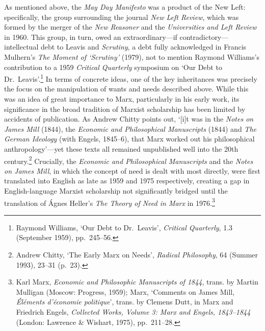 \documentclass[]{article}
\begin{document}
As mentioned above, the \emph{May Day Manifesto} was a product of the
New Left: specifically, the group surrounding the journal \emph{New Left
Review}, which was formed by the merger of the \emph{New Reasoner} and
the \emph{Universities and Left Review} in 1960. This group, in turn,
owed an extraordinary---if contradictory---intellectual debt to Leavis
and \emph{Scrutiny}, a debt fully acknowledged in Francis Mulhern's
\emph{The Moment of `Scrutiny'} (1979), not to mention Raymond
Williams's contribution to a 1959 \emph{Critical Quarterly} symposium on
`Our Debt to Dr.~Leavis'.\footnote{Raymond Williams, `Our Debt to
  Dr.~Leavis', \emph{Critical Quarterly}, 1.3 (September 1959),
  pp.~245--56.} In terms of concrete ideas, one of the key inheritances
was precisely the focus on the manipulation of wants and needs described
above. While this was an idea of great importance to Marx, particularly
in his early work, its significance in the broad tradition of Marxist
scholarship has been limited by accidents of publication. As Andrew
Chitty points out, `{[}i{]}t was in the \emph{Notes on James Mill}
(1844), the \emph{Economic and Philosophical Manuscripts} (1844) and
\emph{The German Ideology} (with Engels, 1845--6), that Marx worked out
his philosophical anthropology'---yet these texts all remained
unpublished well into the 20th century.\footnote{Andrew Chitty, `The
  Early Marx on Needs', \emph{Radical Philosophy}, 64 (Summer 1993),
  23--31 (p.~23).} Crucially, the \emph{Economic and Philosophical
Manuscripts} and the \emph{Notes on James Mill}, in which the concept of
need is dealt with most directly, were first translated into English as
late as 1959 and 1975 respectively, creating a gap in English-language
Marxist scholarship not significantly bridged until the translation of
Ágnes Heller's \emph{The Theory of Need in Marx} in 1976.\footnote{Karl
  Marx, \emph{Economic and Philosophic Manuscripts of 1844}, trans. by
  Martin Mulligan (Moscow: Progress, 1959); Marx, `Comments on James
  Mill, \emph{Éléments d'économie politique}', trans. by Clemens Dutt,
  in Marx and Friedrich Engels, \emph{Collected Works, Volume 3: Marx
  and Engels, 1843--1844} (London: Lawrence \& Wishart, 1975),
  pp.~211--28.}
\end{document}
